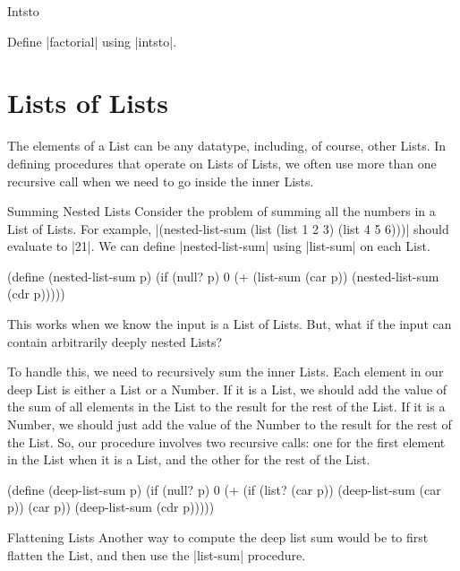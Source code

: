 \begin{schemeregion}
\begin{examplenobar}{Intsto}
\beforeex
\begin{exercise}
Define \scheme|factorial| using \scheme|intsto|.
\solution{\LATER{}}
\end{exercise}
\afterex
\end{examplenobar}

\section{Lists of Lists}\label{sec:listsoflists}

The elements of a List can be any datatype, including, of course, other Lists.  In defining procedures that operate on Lists of Lists, we often use more than one recursive call when we need to go inside the inner Lists.  

\begin{examplenobar}{Summing Nested Lists}
Consider the problem of summing all the numbers in a List of Lists.  For example, \scheme|(nested-list-sum (list (list 1 2 3) (list 4 5 6)))| should evaluate to \schemeresult|21|.  We can define \scheme|nested-list-sum| using \scheme|list-sum| on each List.
\begin{schemedisplay}
(define (nested-list-sum p)
  (if (null? p) 0
      (+ (list-sum (car p))
         (nested-list-sum (cdr p)))))
\end{schemedisplay}
This works when we know the input is a List of Lists.  But, what if the input can contain arbitrarily deeply nested Lists?

To handle this, we need to recursively sum the inner Lists.  Each element in our deep List is either a List or a Number.  If it is a List, we should add the value of the sum of all elements in the List to the result for the rest of the List.  If it is a Number, we should just add the value of the Number to the result for the rest of the List.  So, our procedure involves two recursive calls: one for the first element in the List when it is a List, and the other for the rest of the List.
\begin{schemedisplay}
(define (deep-list-sum p)
  (if (null? p) 0
      (+ (if (list? (car p))
             (deep-list-sum (car p))
             (car p))
         (deep-list-sum (cdr p)))))
\end{schemedisplay}
\end{examplenobar}

\begin{examplenobar}{Flattening Lists}\label{example-list-flatten}
Another way to compute the deep list sum would be to first flatten the List, and then use the \scheme|list-sum| procedure.  


\end{examplenobar}
\end{schemeregion}
